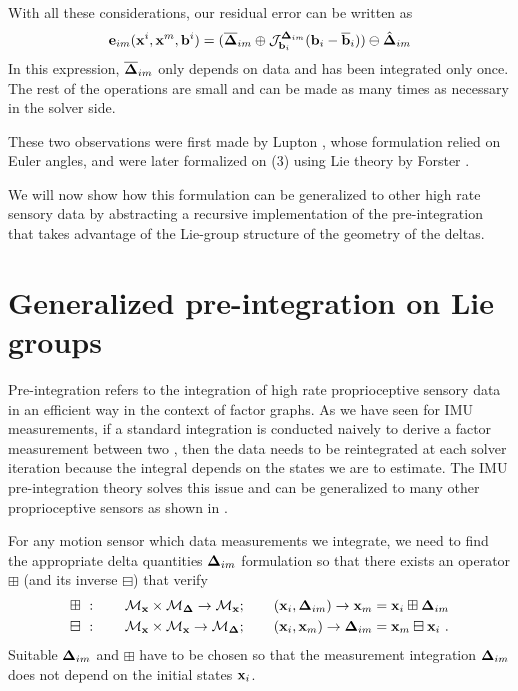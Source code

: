 With all these considerations, our residual error can be written as
%
\begin{align}
    {\bf e}_{im}({\bf x}^i, {\bf x}^m, {\bf b}^i) = (\overline{{{\bm \Delta}}}_{im} \oplus {\mathcal{J}^{{{\bm \Delta}}_{im}}_{{\bf b}_i}}({\bf b}_i-\overline{{\bf b}}_i) ) \ominus \hat{{{\bm \Delta}}}_{im}
    \label{eq:preint_residual}
\end{align}
%
In this expression, $\overline{{{\bm \Delta}}}_{im}$ only depends on data and has been integrated only once. The rest of the operations are small and can be made as many times as necessary in the solver side.

These two observations were first made by Lupton \cite{lupton-09}, whose formulation relied on Euler angles, and were later formalized on \SO(3) using Lie theory
by Forster \cite{forster2017-TRO}. 


We will now show how this formulation can be generalized to other high rate sensory data by abstracting a recursive implementation of the pre-integration that takes advantage of the Lie-group structure of the geometry of the deltas.



\section{Generalized pre-integration on Lie groups}
\label{sec:general-preint}


Pre-integration refers to the integration of high rate proprioceptive sensory data in an efficient way in the context of factor graphs. 
As we have seen for IMU measurements, if a standard integration is conducted naively to derive a factor measurement between two \keyframes, 
then the data needs to be reintegrated at each solver iteration because the integral depends on the states we are to estimate. 
The IMU pre-integration theory solves this issue and can be generalized to many other proprioceptive sensors as shown in \cite{atchuthan-18-thesis,deray-19-selfcalib,fourmy2021contact}. 

For any motion sensor which data measurements we integrate, we need to find the appropriate delta quantities ${{\bm \Delta}}_{im}$ formulation so that there exists an operator $\boxplus$ (and its inverse $\boxminus$) that verify
%
\begin{align}
    \boxplus~&: \quad\quad \mathcal{M}_{{\bf x}} \times \mathcal{M}_{{{\bm \Delta}}} \rightarrow \mathcal{M}_{{\bf x}}; 
    \quad\quad ({\bf x}_i,{{\bm \Delta}}_{im}) \rightarrow {\bf x}_m={\bf x}_i\boxplus {{\bm \Delta}}_{im} \\
    \boxminus~&: \quad\quad \mathcal{M}_{{\bf x}} \times \mathcal{M}_{{\bf x}} \rightarrow \mathcal{M}_{{{\bm \Delta}}}; 
    \quad\quad ({\bf x}_i,{\bf x}_m) \rightarrow {{\bm \Delta}}_{im}={\bf x}_m\boxminus {\bf x}_i~.
\end{align}
%
Suitable ${{\bm \Delta}}_{im}$ and $\boxplus$ have to be chosen so that the measurement integration ${{\bm \Delta}}_{im}$ does not depend on the initial states ${\bf x}_i$.


